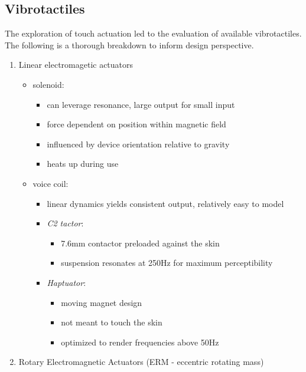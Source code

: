 \subsection{Vibrotactiles}
The exploration of touch actuation led to the evaluation of available vibrotactiles. The following is a thorough breakdown to inform design perspective.
\begin{enumerate}
    \item Linear electromagetic actuators
    \begin{itemize}
        \item solenoid:
        \begin{itemize}
            \item can leverage resonance, large output for small input
            \item force dependent on position within magnetic field
            \item influenced by device orientation relative to gravity
            \item heats up during use
        \end{itemize}
        \item voice coil:
        \begin{itemize}
            \item linear dynamics yields consistent output, relatively easy to model
            \item \textit{C2 tactor}:
            \begin{itemize}
                \item 7.6mm contactor preloaded against the skin
                \item suspension resonates at 250Hz for maximum perceptibility
            \end{itemize}
            \item \textit{Haptuator}:
            \begin{itemize}
                \item moving magnet design
                \item not meant to touch the skin
                \item optimized to render frequencies above 50Hz
            \end{itemize}
        \end{itemize}
    \end{itemize}
    \item Rotary Electromagnetic Actuators (ERM - eccentric rotating mass)
    \begin{itemize}

\end{itemize}
\end{enumerate}
